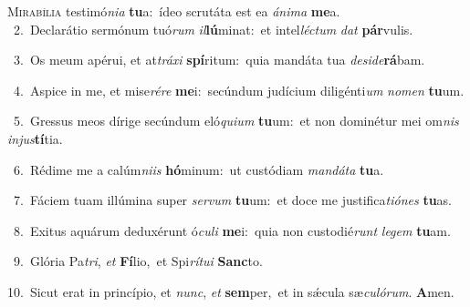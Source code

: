 \lettrine{\initial\textcolor{\initialcolor}{M}}{irabília} testimó\-\textit{ni}\-\textit{a} \textbf{tu}\-a:~\star ídeo scrutáta est ea \textit{á}\-\textit{ni}\textit{ma} \textbf{me}\-a.\\
{\numbfont\textcolor{\numbcolor}{~2.}}~Declarátio sermónum tuó\textit{rum} \textit{il}\-\textbf{lú}minat:~\star et intel\-\textit{léc}\-\textit{tum} \textit{dat} \textbf{pár}\-vulis.\par
{\numbfont\textcolor{\numbcolor}{~3.}}~Os meum apérui, et at\-\textit{trá}\-\textit{xi} \textbf{spí}\-ritum:~\star quia mandáta tua \textit{de}\-\textit{si}\textit{de}\textbf{rá}bam.\par
{\numbfont\textcolor{\numbcolor}{~4.}}~Aspice in me, et mise\-\textit{ré}\-\textit{re} \textbf{me}\-i:~\star secúndum judícium diligénti\textit{um} \textit{no}\-\textit{men} \textbf{tu}\-um.\par
{\numbfont\textcolor{\numbcolor}{~5.}}~Gressus meos dírige secúndum eló\-\textit{qui}\-\textit{um} \textbf{tu}\-um:~\star et non dominétur mei om\textit{nis} \textit{in}\-\textit{jus}\textbf{tí}tia.\par
{\numbfont\textcolor{\numbcolor}{~6.}}~Rédime me a calúm\-\textit{ni}\-\textit{is} \textbf{hó}\-minum:~\star ut custódiam \textit{man}\-\textit{dá}\textit{ta} \textbf{tu}\-a.\par
{\numbfont\textcolor{\numbcolor}{~7.}}~Fáciem tuam illúmina super \textit{ser}\-\textit{vum} \textbf{tu}\-um:~\star et doce me justifica\-\textit{ti}\-\textit{ó}\textit{nes} \textbf{tu}\-as.\par
{\numbfont\textcolor{\numbcolor}{~8.}}~Exitus aquárum deduxérunt ó\-\textit{cu}\-\textit{li} \textbf{me}\-i:~\star quia non custodié\textit{runt} \textit{le}\-\textit{gem} \textbf{tu}\-am.\par
{\numbfont\textcolor{\numbcolor}{~9.}}~Glória Pa\-\textit{tri}\-, \textit{et} \textbf{Fí}\-lio,~\star et Spi\-\textit{rí}\-\textit{tu}\textit{i} \textbf{Sanc}\-to.\par
{\numbfont\textcolor{\numbcolor}{10.}}~Sicut erat in princípio, et \textit{nunc}\-, \textit{et} \textbf{sem}\-per,~\star et in sǽcula sæ\-\textit{cu}\-\textit{ló}\textit{rum}. \textbf{A}\-men.\par
